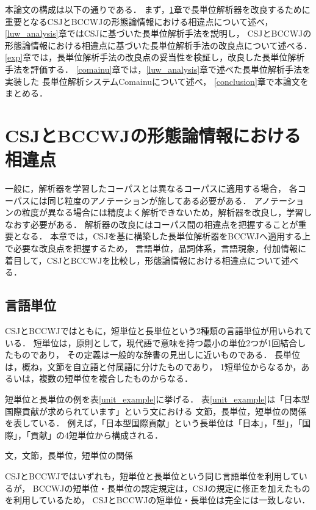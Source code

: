 \documentclass[japanese]{jnlp_1.4}
\begin{document}
本論文の構成は以下の通りである．
まず，\ref{csj_bccwj_diff}章で長単位解析器を改良するために重要となるCSJとBCCWJの形態論情報における相違点について述べ，
\ref{luw_analysis}章ではCSJに基づいた長単位解析手法を説明し，
CSJとBCCWJの形態論情報における相違点に基づいた長単位解析手法の改良点について述べる．
\ref{exp}章では，長単位解析手法の改良点の妥当性を検証し，改良した長単位解析手法を評価する．
\ref{comainu}章では，\ref{luw_analysis}章で述べた長単位解析手法を実装した
長単位解析システムComainuについて述べ，
\ref{conclusion}章で本論文をまとめる．


\section{CSJとBCCWJの形態論情報における相違点}
\label{csj_bccwj_diff}

一般に，解析器を学習したコーパスとは異なるコーパスに適用する場合，
各コーパスには同じ粒度のアノテーションが施してある必要がある．
アノテーションの粒度が異なる場合には精度よく解析できないため，解析器を改良し，学習しなおす必要がある．
解析器の改良にはコーパス間の相違点を把握することが重要となる．
本章では，CSJを基に構築した長単位解析器をBCCWJへ適用する上で必要な改良点を把握するため，
言語単位，品詞体系，言語現象，付加情報に着目して，CSJとBCCWJを比較し，形態論情報における相違点について述べる．


\subsection{言語単位}
\label{lang_unit_diff}

CSJとBCCWJではともに，短単位と長単位という2種類の言語単位が用いられている．
短単位は，原則として，現代語で意味を持つ最小の単位2つが1回結合したものであり，
その定義は一般的な辞書の見出しに近いものである．
長単位は，概ね，文節を自立語と付属語に分けたものであり，
1短単位からなるか，あるいは，複数の短単位を複合したものからなる．

短単位と長単位の例を表\ref{unit_example}に挙げる．
表\ref{unit_example}は「日本型国際貢献が求められています」という文における
文節，長単位，短単位の関係を表している．
例えば，「日本型国際貢献」という長単位は「日本」，「型」，「国際」，「貢献」の4短単位から構成される．

\begin{table}[b]
\caption{文，文節，長単位，短単位の関係}
\label{unit_example}

\end{table} 

CSJとBCCWJではいずれも，短単位と長単位という同じ言語単位を利用しているが，
BCCWJの短単位・長単位の認定規定は，CSJの規定に修正を加えたものを利用しているため，
CSJとBCCWJの短単位・長単位は完全には一致しない．
\end{document}
